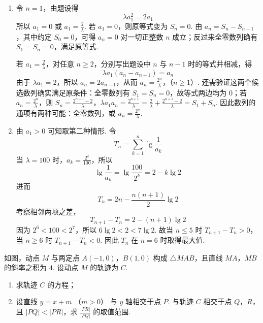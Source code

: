 \begin{solution}
\begin{enumerate}
\item 令 \(n=1\)，由题设得
\[
\lambda a_1^2=2a_1
\]
所以 \(a_1=0\) 或 \(a_1=\frac2\lambda\). 若 \(a_1=0\)，则原等式变为 \(S_n=0\). 由 \(a_n=S_n-S_{n-1}\)，其中约定 \(S_0=0\)，可得 \(a_n=0\) 对一切正整数 \(n\) 成立；反过来全零数列确有 \(S_1=S_n=0\)，满足原等式.

若 \(a_1=\frac2\lambda\)，对任意 \(n\geq2\)，分别写出题设中 \(n\) 与 \(n-1\) 时的等式并相减，得
\[
\lambda a_1(a_n-a_{n-1})=a_n
\]
由于 \(\lambda a_1=2\)，所以 \(a_n=2a_{n-1}\)，从而
\(a_n=\frac{2^n}{\lambda}\)，（\(n\geq1\)）.
还需验证这两个候选数列确实满足原条件：全零数列有 \(S_1=S_n=0\)，故等式两边均为 \(0\)；若 \(a_n=\frac{2^n}{\lambda}\)，则
\(S_n=\frac{2^{n+1}-2}{\lambda}\)，\(\lambda a_1a_n=\frac{2^{n+1}}{\lambda} =\frac2\lambda+\frac{2^{n+1}-2}{\lambda}=S_1+S_n\).
因此数列的通项有两种可能：全零数列，或 \(a_n=\frac{2^n}{\lambda}\).
\item 由 \(a_1>0\) 可知取第二种情形. 令
\[
T_n=\sum_{k=1}^{n}\lg\frac1{a_k}
\]
当 \(\lambda=100\) 时，\(a_k=\frac{2^k}{100}\)，所以
\[
\lg\frac1{a_k}=\lg\frac{100}{2^k}=2-k\lg2
\]
进而
\[
T_n=2n-\frac{n(n+1)}2\lg2
\]
考察相邻两项之差，
\[
T_{n+1}-T_n=2-(n+1)\lg2
\]
因为 \(2^6<100<2^7\)，所以 \(6\lg2<2<7\lg2\). 故当 \(n\leq5\) 时 \(T_{n+1}-T_n>0\)，当 \(n\geq6\) 时 \(T_{n+1}-T_n<0\). 因此 \(T_n\) 在 \(n=6\) 时取得最大值.
\end{enumerate}
\end{solution}

\begin{problem}
如图，动点 \(M\) 与两定点 \(A(-1,0)\)，\(B(1,0)\) 构成 \(\triangle MAB\)，且直线 \(MA\)，\(MB\) 的斜率之积为 \(4\). 设动点 \(M\) 的轨迹为 \(C\).
\begin{enumerate}
\item 求轨迹 \(C\) 的方程；
\item 设直线 \( y = x + m \) （\( m > 0 \)） 与 \( y \) 轴相交于点 \(P\). 与轨迹 \(C\) 相交于点 \(Q\)，\(R\)，且 \( |PQ| < |PR| \)，求 \( \frac{|PR|}{|PQ|} \) 的取值范围.
\end{enumerate}
\end{problem}

